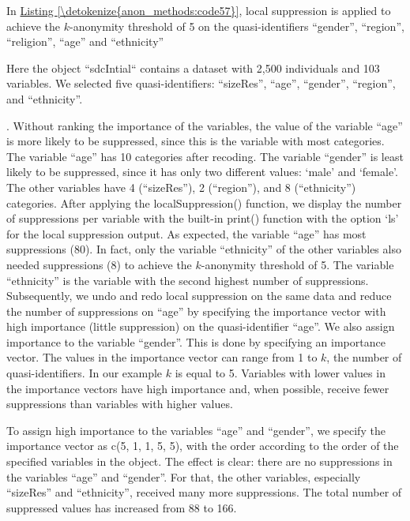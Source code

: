 \documentclass[letterpaper,10pt,english]{sphinxmanual}
\begin{document}
In \hyperref[\detokenize{anon_methods:code57}]{Listing \ref{\detokenize{anon_methods:code57}}}, local suppression is applied to achieve the
\(k\)-anonymity threshold of 5 on the quasi-identifiers “gender”,
“region”, “religion”, “age” and “ethnicity” %
\begin{footnote}[6]\sphinxAtStartFootnote
Here the  object “sdcIntial“ contains a dataset with 2,500
individuals and 103 variables. We selected five quasi-identifiers:
“sizeRes”, “age”, “gender”, “region”, and “ethnicity”.
%
\end{footnote}.
Without ranking the importance of the variables, the value of the
variable “age” is more likely to be suppressed, since this is the
variable with most categories. The variable “age” has 10 categories
after recoding. The variable “gender” is least likely to be suppressed,
since it has only two different values: ‘male’ and ‘female’. The other
variables have 4 (“sizeRes”), 2 (“region”), and 8 (“ethnicity”)
categories. After applying the localSuppression() function, we display
the number of suppressions per variable with the built-in print()
function with the option ‘ls’ for the local suppression output. As
expected, the variable “age” has most suppressions (80). In fact, only
the variable “ethnicity” of the other variables also needed suppressions
(8) to achieve the \(k\)-anonymity threshold of 5. The variable
“ethnicity” is the variable with the second highest number of
suppressions. Subsequently, we undo and redo local suppression on the
same data and reduce the number of suppressions on “age” by specifying
the importance vector with high importance (little suppression) on the
quasi-identifier “age”. We also assign importance to the variable
“gender”. This is done by specifying an importance vector. The values in
the importance vector can range from 1 to \(k\), the number of
quasi-identifiers. In our example \(k\) is equal to 5. Variables
with lower values in the importance vectors have high importance and,
when possible, receive fewer suppressions than variables with higher
values.

To assign high importance to the variables “age” and “gender”, we
specify the importance vector as c(5, 1, 1, 5, 5), with the order
according to the order of the specified variables in the 
object. The effect is clear: there are no suppressions in the variables
“age” and “gender”. For that, the other variables, especially “sizeRes”
and “ethnicity”, received many more suppressions. The total number of
suppressed values has increased from 88 to 166.
\end{document}
